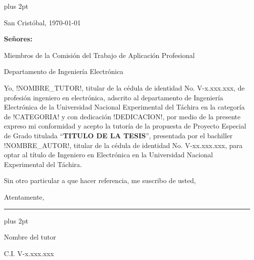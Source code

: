 \begin{titlepage}
\parskip=7.25pt plus 2pt
\setcounter{page}{3}
\begin{flushright}
	San Cristóbal, \today
\end{flushright}

\vspace{1cm}
\vfill

\begin{flushleft}
		\singlespacing
		
		\setlength{\parskip}{0pt}
		
		\textbf{Señores:}
		
		Miembros de la Comisión del Trabajo de Aplicación Profesional
		
		Departamento de Ingeniería Electrónica
		
\end{flushleft}

\vfill
\begin{spacing}{1.5}
	Yo, !NOMBRE\_TUTOR!, titular de la cédula de identidad No. \mbox{V-x.xxx.xxx}, de profesión ingeniero en electrónica, adscrito al departamento de Ingeniería Electrónica de la Universidad Nacional Experimental del Táchira en la categoría de !CATEGORIA! y con dedicación !DEDICACION!, por medio de la presente expreso mi conformidad y acepto la tutoría de la propuesta de Proyecto Especial de Grado titulada \enquote{\textbf{TITULO DE LA TESIS}}, presentada por el bachiller !NOMBRE\_AUTOR!, titular de la cédula de identidad No. \mbox{V-xx.xxx.xxx}, para optar al título de Ingeniero en Electrónica en la Universidad Nacional Experimental del Táchira.
	
	Sin otro particular a que hacer referencia, me suscribo de usted,
	
	\setlength{\parskip}{20pt} 
	
	\noindent Atentamente,
\end{spacing}

\vfill

\begin{center}
	
	\rule{6cm}{1pt}
	
	\vspace{0.2cm}
	
	\parskip=0pt plus 2pt
    
    \begin{spacing}{1}    
        Nombre del tutor
    
        C.I. V-x.xxx.xxx
    \end{spacing}
\end{center}

\vspace{0.5cm}

\end{titlepage}